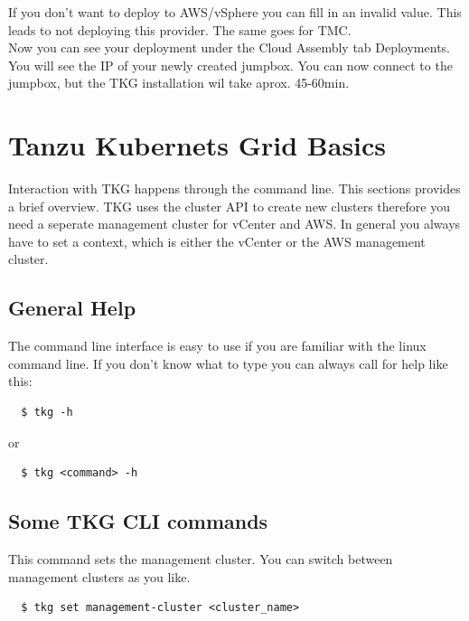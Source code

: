\documentclass{article}
\begin{document}
 If you don't want to deploy to AWS/vSphere you can fill in an invalid value. This leads to not deploying this provider. The same goes for TMC.
\\

\noindent Now you can see your deployment under the Cloud Assembly tab Deployments. You will see the IP of your newly created jumpbox. You can now connect to the jumpbox, but the TKG installation wil take aprox. 45-60min.



\section{Tanzu Kubernets Grid Basics}

Interaction with TKG happens through the command line. This sections provides a brief overview.
TKG uses the cluster API \citep{clusterapi} to create new clusters therefore you need a seperate management cluster for vCenter and AWS. In general you always have to set a context, which is either the vCenter or the AWS management cluster. \\

\subsection{General Help}

The command line interface is easy to use if you are familiar with the linux command line. If you don't know what to type you can always call for help like this:

\begin{lstlisting}
  $ tkg -h
\end{lstlisting}

or 

\begin{lstlisting}
  $ tkg <command> -h
\end{lstlisting}




\subsection{Some TKG CLI commands}

\noindent This command sets the management cluster. You can switch between management clusters as you like.
\begin{lstlisting}
  $ tkg set management-cluster <cluster_name> 
\end{lstlisting}
\end{document}
